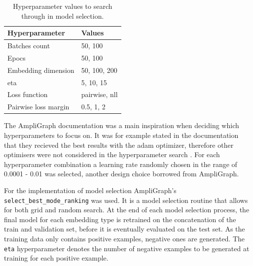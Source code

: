 \begin{table}[h]
\centering
\begin{tabular}{|l|l|}
\hline
\textbf{Hyperparameter}      & \textbf{Values}             \\ \hline
Batches count       & 50, 100                              \\ \hline
Epocs               & 50, 100                          \\ \hline
Embedding dimension                   & 50, 100, 200                     \\ \hline
eta                 & 5, 10, 15                            \\ \hline
Loss function   & pairwise, nll                         \\ \hline
Pairwise loss margin    & 0.5, 1, 2                    \\ \hline
\end{tabular}
\caption{Hyperparameter values to search through in model selection.}
\end{table}
The AmpliGraph documentation was a main inspiration when deciding which hyperparameters to focus on. It was for example stated in the documentation that they recieved the best results with the adam optimizer, therefore other optimisers were not considered in the hyperparameter search \cite{ampligraph_documentation}. For each hyperparameter combination a learning rate randomly chosen in the range of 0.0001 - 0.01 was selected, another design choice borrowed from AmpliGraph.

For the implementation of model selection AmpliGraph's \texttt{select\_best\_mode\_ranking} was used. It is a model selection routine that allows for both grid and random search. At the end of each model selection process, the final model for each embedding type is retrained on the concatenation of the train and validation set, before it is eventually evaluated on the test set. As the training data only contains positive examples, negative ones are generated. The \texttt{eta} hyperparameter denotes the number of negative examples to be generated at training for each positive example. %

